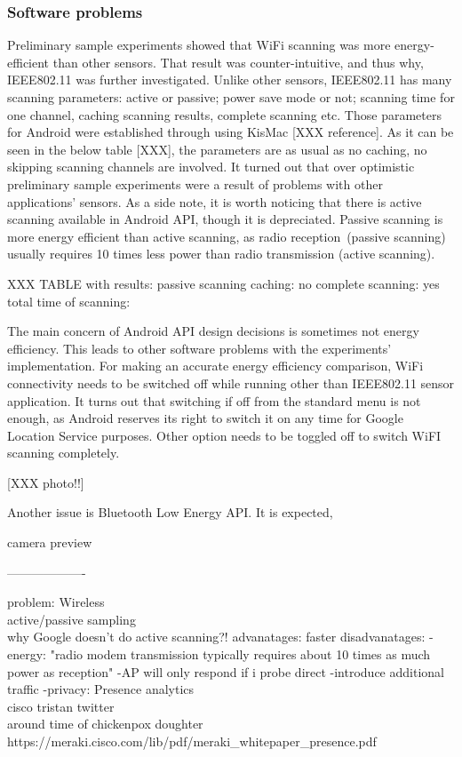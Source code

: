\subsubsection{Software problems}
Preliminary sample experiments showed that WiFi scanning was more energy-efficient than other sensors. That result was counter-intuitive, and thus why, IEEE802.11 was further investigated. Unlike other sensors, IEEE802.11 has many scanning parameters: active or passive; power save mode or not; scanning time for one channel, caching scanning results, complete scanning etc. Those parameters for Android were established through using KisMac [XXX reference]. As it can be seen in the below table [XXX], the parameters are as usual as no caching, no skipping  scanning channels are involved. It turned out that over optimistic preliminary sample experiments were a result of problems with other applications' sensors. As a side note, it is worth noticing that there is active scanning available in Android API, though it is depreciated. Passive scanning is more energy efficient than active scanning, as radio reception\ (passive scanning) usually requires 10 times less power than radio transmission (active scanning).


XXX TABLE with results:
passive scanning
caching: no
complete scanning: yes
total time of scanning:

The main concern of Android API design decisions is sometimes not energy efficiency. This leads to other software problems with the experiments' implementation. For making an accurate energy efficiency comparison, WiFi connectivity needs to be switched off while running other than IEEE802.11 sensor application. It turns out that switching if off from the standard menu is not enough, as Android reserves its right to switch it on any time for Google Location Service purposes. Other option needs to be toggled off to switch WiFI scanning completely. 

[XXX photo!!]

Another issue is Bluetooth Low Energy API. It is expected, 

camera preview

-------------------

problem: Wireless\\	
	active/passive sampling\\
		why Google doesn't do active scanning?!
			advanatages: faster
			disadvanatages: 
				-energy:
					"radio modem transmission typically requires about 10 times as much power as reception"
				-AP will only respond if i probe direct 
				-introduce additional  traffic
				-privacy:
					Presence analytics\\
						cisco tristan twitter\\
							around time of chickenpox doughter\\
							https://meraki.cisco.com/lib/pdf/meraki\_whitepaper\_presence.pdf\\
				
